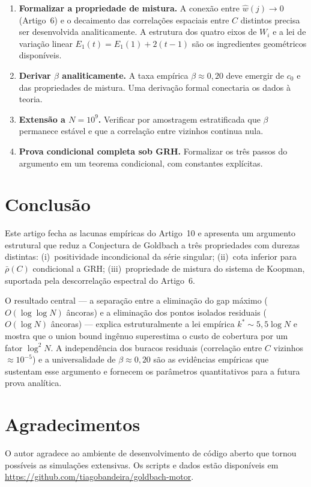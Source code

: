 \documentclass[11pt]{article}
\theoremstyle{definition}
\begin{document}
	\begin{enumerate}
		\item \textbf{Formalizar a propriedade de mistura.} A conexão entre $\widehat{w}(j)\to 0$ (Artigo~6) e o decaimento das correlações espaciais entre $C$ distintos precisa ser desenvolvida analiticamente. A estrutura dos quatro eixos de $W_i$ e a lei de variação linear $E_1(t)=E_1(1)+2(t-1)$ são os ingredientes geométricos disponíveis.
		\item \textbf{Derivar $\beta$ analiticamente.} A taxa empírica $\beta\approx 0{,}20$ deve emergir de $c_0$ e das propriedades de mistura. Uma derivação formal conectaria os dados à teoria.
		\item \textbf{Extensão a $N=10^9$.} Verificar por amostragem estratificada que $\beta$ permanece estável e que a correlação entre vizinhos continua nula.
		\item \textbf{Prova condicional completa sob GRH.} Formalizar os três passos do argumento em um teorema condicional, com constantes explícitas.
	\end{enumerate}
	
	\section{Conclusão}
	
	Este artigo fecha as lacunas empíricas do Artigo~10 e apresenta um argumento estrutural que reduz a Conjectura de Goldbach a três propriedades com durezas distintas: (i)~positividade incondicional da série singular; (ii)~cota inferior para $\bar\rho(C)$ condicional a GRH; (iii)~propriedade de mistura do sistema de Koopman, suportada pela descorrelação espectral do Artigo~6.
	
	O resultado central — a separação entre a eliminação do gap máximo ($O(\log\log N)$ âncoras) e a eliminação dos pontos isolados residuais ($O(\log N)$ âncoras) — explica estruturalmente a lei empírica $k^*\sim 5{,}5\log N$ e mostra que o union bound ingênuo superestima o custo de cobertura por um fator $\log^2 N$. A independência dos buracos residuais (correlação entre $C$ vizinhos $\approx 10^{-5}$) e a universalidade de $\beta\approx 0{,}20$ são as evidências empíricas que sustentam esse argumento e fornecem os parâmetros quantitativos para a futura prova analítica.
	
	\section*{Agradecimentos}
	O autor agradece ao ambiente de desenvolvimento de código aberto que tornou possíveis as simulações extensivas. Os scripts e dados estão disponíveis em \url{https://github.com/tiagobandeira/goldbach-motor}.
	
\end{document}
